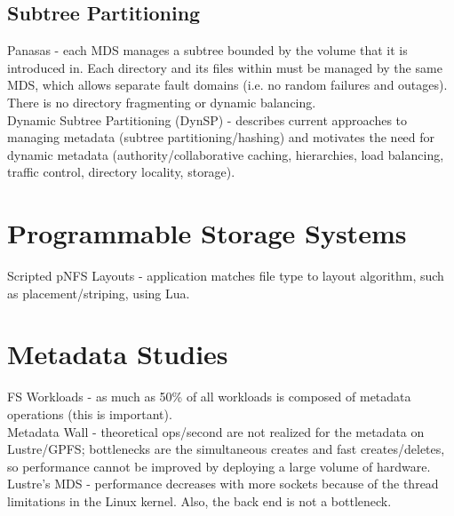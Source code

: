 \documentclass{article}
\begin{document}
\subsection{Subtree Partitioning}

\noindent\cite{welch:fast2008-panasas} Panasas - each MDS manages a subtree bounded by the volume that it is introduced in. Each directory and its files within must be managed by the same MDS, which allows separate fault domains (i.e. no random failures and outages). There is no directory fragmenting or dynamic balancing.\\

\noindent\cite{weil:sc2004-dyn-metadata} Dynamic Subtree Partitioning (DynSP) - describes current approaches to managing metadata (subtree partitioning/hashing) and motivates the need for dynamic metadata (authority/collaborative caching, hierarchies, load balancing, traffic control, directory locality, storage). \\

\section{Programmable Storage Systems}

\noindent\cite{grawinkel:pdsw2012-lua} Scripted pNFS Layouts - application matches file type to layout algorithm, such as placement/striping, using Lua.\\




\section{Metadata Studies}
\noindent\cite{roselli:atec2000-FS-workloads} FS Workloads - as much as 50\% of all workloads is composed of metadata operations (this is important). \\

\noindent\cite{alam:pdsw2011-metadata-scaling} Metadata Wall - theoretical ops/second are not realized for the metadata on Lustre/GPFS; bottlenecks are the simultaneous creates and fast creates/deletes, so performance cannot be improved by deploying a large volume of hardware.\\

\noindent\cite{konstantinos:pdsw2014-lustre-metadata} Lustre's MDS - performance decreases with more sockets because of the thread limitations in the Linux kernel. Also, the back end is not a bottleneck.\\
\end{document}
